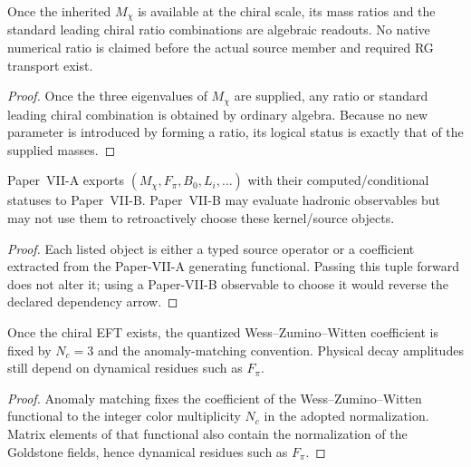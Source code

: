 \documentclass[12pt,a4paper]{article}
\begin{document}
\begin{corollary}
\label{p10:cor:native-light-quark-ratio-package}
Once the inherited \(M_\chi\) is available at the chiral scale, its mass ratios and the standard leading chiral ratio combinations are algebraic readouts.  No native numerical ratio is claimed before the actual source member and required RG transport exist.
\end{corollary}
\begin{proof}
Once the three eigenvalues of $M_\chi$ are supplied, any ratio or standard leading chiral combination is obtained by ordinary algebra.  Because no new parameter is introduced by forming a ratio, its logical status is exactly that of the supplied masses.
\end{proof}

\begin{theorem}
\label{p10:thm:pseudoscalar-source-matrix-export}
Paper~VII-A exports \((M_\chi,F_\pi,B_0,L_i,\ldots)\) with their computed/conditional statuses to Paper~VII-B.  Paper~VII-B may evaluate hadronic observables but may not use them to retroactively choose these kernel/source objects.
\end{theorem}
\begin{proof}
Each listed object is either a typed source operator or a coefficient extracted from the Paper-VII-A generating functional.  Passing this tuple forward does not alter it; using a Paper-VII-B observable to choose it would reverse the declared dependency arrow.
\end{proof}

\begin{theorem}
\label{p10:thm:wzw-anomaly-normalization}
Once the chiral EFT exists, the quantized Wess--Zumino--Witten coefficient is fixed by \(N_c=3\) and the anomaly-matching convention.  Physical decay amplitudes still depend on dynamical residues such as \(F_\pi\).
\end{theorem}
\begin{proof}
Anomaly matching fixes the coefficient of the Wess--Zumino--Witten functional to the integer color multiplicity $N_c$ in the adopted normalization.  Matrix elements of that functional also contain the normalization of the Goldstone fields, hence dynamical residues such as $F_\pi$.
\end{proof}
\end{document}

